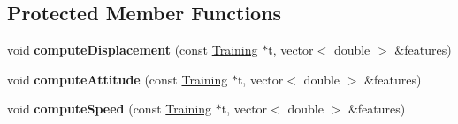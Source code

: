 \subsection*{Protected Member Functions}
\begin{DoxyCompactItemize}
\item 
\hypertarget{class_m_l_data_ae765a15668c6e9712f8a80e0e7e51318}{void {\bfseries compute\-Displacement} (const \hyperlink{class_training}{Training} $\ast$t, vector$<$ double $>$ \&features)}\label{class_m_l_data_ae765a15668c6e9712f8a80e0e7e51318}

\item 
\hypertarget{class_m_l_data_a1b7e769886def696342570e1cc8dfed3}{void {\bfseries compute\-Attitude} (const \hyperlink{class_training}{Training} $\ast$t, vector$<$ double $>$ \&features)}\label{class_m_l_data_a1b7e769886def696342570e1cc8dfed3}

\item 
\hypertarget{class_m_l_data_a41b970ab7a434b3b8f17abdae6008993}{void {\bfseries compute\-Speed} (const \hyperlink{class_training}{Training} $\ast$t, vector$<$ double $>$ \&features)}\label{class_m_l_data_a41b970ab7a434b3b8f17abdae6008993}

\end{DoxyCompactItemize}
